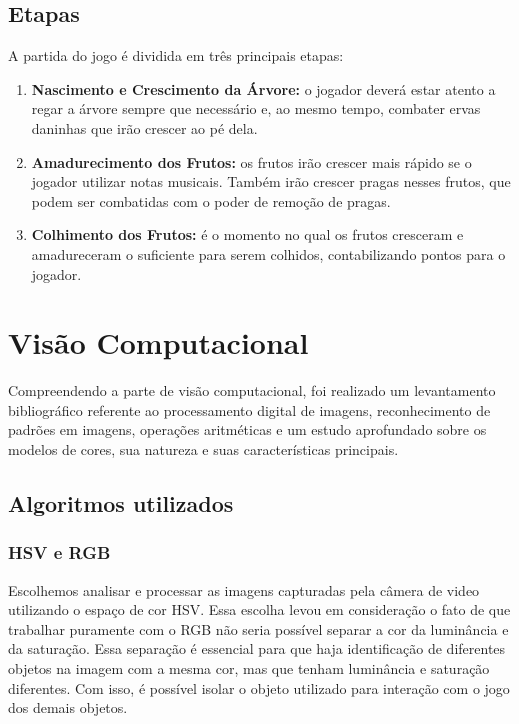 \documentclass[12pt]{article}
\begin{document}
\subsection{Etapas}
A partida do jogo \'e dividida em tr\^es principais etapas: 

\begin{enumerate}
\item \textbf{Nascimento e Crescimento da \'Arvore:} o jogador dever\'a estar atento a regar a \'arvore sempre que
necess\'ario e, ao mesmo tempo, combater ervas daninhas que ir\~ao crescer ao p\'e dela.
\item \textbf{Amadurecimento dos Frutos:} os frutos ir\~ao crescer mais r\'apido se o jogador utilizar notas musicais.
Tamb\'em ir\~ao crescer pragas nesses frutos, que podem ser combatidas com o poder de remo\c c\~ao de pragas.
\item \textbf{Colhimento dos Frutos:} \'e o momento no qual os frutos cresceram e amadureceram
 o suficiente para serem colhidos, contabilizando pontos para o jogador.
\end{enumerate}

\section{Vis\~ao Computacional}

Compreendendo a parte de vis\~ao computacional, foi realizado um levantamento bibliogr\'afico
referente ao processamento digital de imagens, reconhecimento de padr\~oes em imagens, opera\c c\~oes
aritm\'eticas e um estudo aprofundado sobre os modelos de cores, sua natureza e suas caracter\'isticas principais.

\subsection{Algoritmos utilizados\label{sec:alg}}
\subsubsection{HSV e RGB}
Escolhemos analisar e processar as imagens capturadas pela c\^amera de video utilizando o espa\c co de cor
HSV. Essa escolha levou em considera\c c\~ao o fato de que trabalhar puramente com o RGB n\~ao seria poss\'ivel
separar a cor da lumin\^ancia e da satura\c c\~ao. Essa separa\c c\~ao \'e essencial para que haja identifica\c c\~ao 
de diferentes objetos na imagem com a mesma cor, mas que  tenham lumin\^ancia e satura\c c\~ao diferentes. Com isso,
\'e poss\'ivel isolar o objeto utilizado para intera\c c\~ao com o jogo dos demais objetos.
\end{document}
